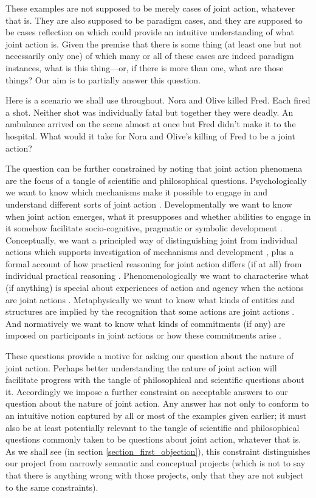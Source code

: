 \documentclass[12pt,a4paper]{extarticle}
\begin{document}
These examples are not supposed to be merely cases of joint action, whatever that is.
They are also supposed to be paradigm cases, 
and they are supposed to be cases reflection on which could provide an intuitive understanding of what joint action is.
Given the premise that there is some thing (at least one but not necessarily only one) of which many or all of these cases are indeed paradigm instances,
what is this thing---or, if there is more than one, what are those things?
Our aim is to partially answer this question.

Here is a scenario we shall use throughout.
Nora and Olive killed Fred.  
Each fired a shot.
Neither shot was individually fatal but together they were deadly.
An ambulance arrived on the scene almost at once but Fred didn't make it to the hospital.
What would it take for Nora and Olive's killing of Fred to be a joint action?

The question can be further constrained by noting that joint action phenomena are the focus of a tangle of scientific and philosophical questions.  Psychologically we want to know which mechanisms make it possible to engage in and understand different sorts of joint action
\citep{vesper_minimal_2010}.  
Developmentally we want to know when joint action emerges, what it presupposes and whether abilities to engage in it somehow facilitate socio-cognitive, pragmatic or symbolic development \citep{Moll:2007gu,Hughes:2004zj,Brownell:2006gu}.  
Conceptually, we want a principled way of distinguishing joint from individual actions which supports investigation of mechanisms and development \citep{Bratman:2009lv}, plus a formal account of how practical reasoning for joint action differs (if at all) from individual practical reasoning \citep{Sugden:2000mw,Gold:2007zd}.  
Phenomenologically we want to characterise what (if anything) is special about experiences of action and agency when the actions are joint actions \citep{Pacherie:2010fk}.  
Metaphysically we want to know what kinds of entities and structures are implied by the recognition that some actions are joint actions \citep{Gilbert:1992rs,Searle:1994lb}.  
And normatively we want to know what kinds of commitments (if any) are imposed on participants in joint actions or how these commitments arise \citep{Roth:2004ki}.

These questions provide a motive for asking our question about the nature of joint action.
Perhaps better understanding the nature of joint action will facilitate  progress with the tangle of philosophical and scientific questions about it.
Accordingly we impose a further constraint on acceptable answers to our question about the nature of joint action.
Any answer has not only to conform to an intuitive notion captured by all or most of the examples given earlier; 
it must also be at least potentially relevant to the tangle of scientific and philosophical questions commonly taken to be questions about joint action, whatever that is.
As we shall see (in section \vref{section_first_objection}), 
this constraint distinguishes our project from narrowly semantic and conceptual projects (which is not to say that there is anything wrong with those projects, only that they are not subject to the same constraints).
\end{document}
